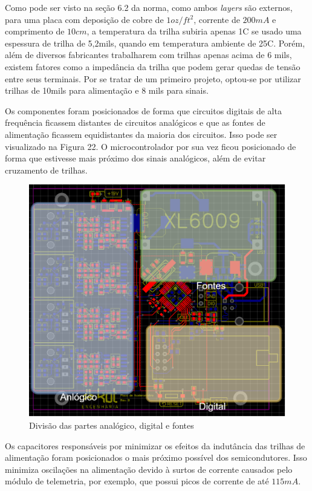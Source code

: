 \documentclass[
	12pt,				%
	openright,			%
	twoside,			%
	a4paper,			%
	english,			%
	french,				%
	spanish,			%
	brazil,				%
	]{abntex2}
\begin{document}
			Como pode ser visto na seção 6.2 da norma, como ambos \textit{layers} são
			externos, para uma placa com deposição de cobre de $1oz/ft^2$,
			corrente de $200mA$ e comprimento de $10cm$, a temperatura da
			trilha subiria apenas 1\textdegree C se usado uma espessura de
			trilha de 5,2mils, quando em temperatura ambiente de
			25\textdegree C. Porém, além de diversos fabricantes trabalharem
			com trilhas apenas acima de 6 mils, existem fatores como a
			impedância da trilha que podem gerar quedas de tensão entre seus
			terminais. Por se tratar de um primeiro projeto, optou-se por
			utilizar trilhas de 10mils para alimentação e 8 mils para
			sinais. 

			Os componentes foram posicionados de forma que circuitos
			digitais de alta frequência ficassem distantes de circuitos
			analógicos e que as fontes de alimentação ficassem equidistantes
			da maioria dos circuitos. Isso pode ser visualizado na Figura
			22. O microcontrolador por sua vez ficou posicionado de forma
			que estivesse mais próximo dos sinais analógicos, além de evitar
			cruzamento de trilhas.

			\begin{figure}[!ht]
				\centering
				\includegraphics[width=\linewidth]{../Fotos/analogDigitalFonte.png}
				\caption{Divisão das partes analógico, digital e fontes}
			\end{figure}

			Os capacitores responsáveis por minimizar os efeitos da
			indutância das trilhas de alimentação foram posicionados o mais
			próximo possível dos semicondutores. Isso minimiza oscilações na
			alimentação devido à surtos de corrente causados pelo módulo de
			telemetria, por exemplo, que possui picos de corrente de até $115mA$.
\end{document}
